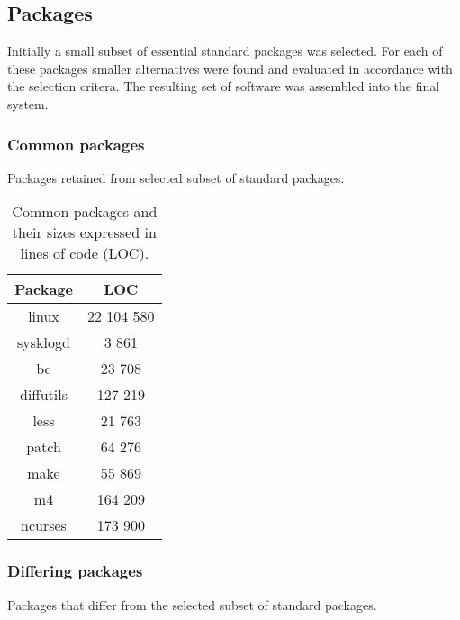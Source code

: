 \subsection{Packages}\label{Packages}

Initially a small subset of essential standard packages was selected. For each of these packages smaller alternatives were found and evaluated in accordance with the selection critera. The resulting set of software was assembled into the final system.

\subsubsection{Common packages}

Packages retained from selected subset of standard packages:

\begin{table}[!h]
    \centering
    \begin{tabular}{|c||c|}
        \hline
        Package & LOC \\
        \hline
        \hline
        linux \cite{linux} & 22 104 580 \\
        \hline
        sysklogd \cite{sysklogd} & 3 861 \\
        \hline
        bc \cite{bc} & 23 708 \\
        \hline        
        diffutils \cite{diffutils} & 127 219 \\
        \hline
        less \cite{less} & 21 763 \\
        \hline
        patch \cite{patch} & 64 276 \\
        \hline
        make \cite{make} & 55 869 \\
        \hline
        m4 \cite{m4} & 164 209 \\
        \hline
        ncurses \cite{ncurses} & 173 900 \\
        \hline
    \end{tabular}
    \caption{Common packages and their sizes expressed in lines of code (LOC).}
\end{table}

\newpage

\subsubsection{Differing packages}

Packages that differ from the selected subset of standard packages.

